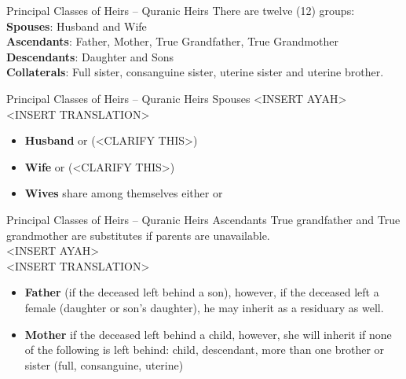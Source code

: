 \begin{frame}{Principal Classes of Heirs -- Quranic Heirs}
There are twelve (12) groups:\\
\textbf{Spouses}: Husband and Wife\\
\textbf{Ascendants}: Father, Mother, True Grandfather, True Grandmother\\
\textbf{Descendants}: Daughter and Sons\\
\textbf{Collaterals}: Full sister, consanguine sister, uterine sister and uterine brother.
\end{frame}

\begin{frame}{Principal Classes of Heirs -- Quranic Heirs \hfill Spouses}
<INSERT AYAH>\\
<INSERT TRANSLATION>

\begin{itemize}
\item \textbf{Husband}  or  (<CLARIFY THIS>)
\item \textbf{Wife}  or  (<CLARIFY THIS>)
\item \textbf{Wives} share among themselves either  or 
\end{itemize}
\end{frame}

\begin{frame}{Principal Classes of Heirs -- Quranic Heirs \hfill Ascendants}
True grandfather and True grandmother are substitutes if parents are unavailable.\\
<INSERT AYAH>\\
<INSERT TRANSLATION>\\
\begin{itemize}
\item \textbf{Father}  (if the deceased left behind a son), however, if the deceased left a female (daughter or son's daughter), he may inherit as a residuary as well.
\item \textbf{Mother}  if the deceased left behind a child, however, she will inherit  if none of the following is left behind: child, descendant, more than one brother or sister (full, consanguine, uterine)
\end{itemize}
\end{frame}